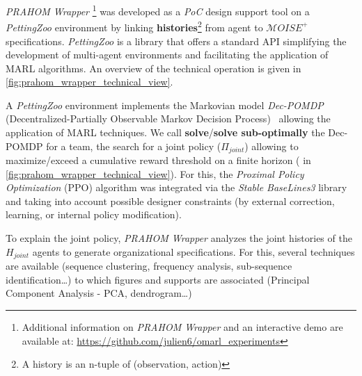 \documentclass[doubleblind]{ecai}
\begin{document}
\emph{PRAHOM Wrapper}\label{PettingZoo-wrapper}
\footnote{Additional information on \emph{PRAHOM Wrapper} and an interactive demo are available at: \url{https://github.com/julien6/omarl_experiments}}
was developed as a \emph{PoC} design support tool on a \emph{PettingZoo} environment by linking \textbf{histories}\footnote{A history is an n-tuple of (observation, action)} from agent to $\mathcal{M}OISE^+$ specifications. \emph{PettingZoo} is a library that offers a standard API simplifying the development of multi-agent environments and facilitating the application of MARL algorithms. An overview of the technical operation is given in \autoref{fig:prahom_wrapper_technical_view}.

A \emph{PettingZoo} environment implements the Markovian model \emph{Dec-POMDP} (Decentralized-Partially Observable Markov Decision Process)~\cite{Oliehoek2016} allowing the application of MARL techniques.
We call \textbf{solve}/\textbf{solve sub-optimally} the Dec-POMDP for a team, the search for a joint policy ($\Pi_{joint}$) allowing to maximize/exceed a cumulative reward threshold on a finite horizon ( in \autoref{fig:prahom_wrapper_technical_view}). For this, the \emph{Proximal Policy Optimization} (PPO) algorithm was integrated via the \emph{Stable BaseLines3} library and taking into account possible designer constraints (by external correction, learning, or internal policy modification).


To explain the joint policy, \emph{PRAHOM Wrapper} analyzes the joint histories of the $H_{joint}$ agents to generate organizational specifications. For this, several techniques are available (sequence clustering, frequency analysis, sub-sequence identification\dots) to which figures and supports are associated (Principal Component Analysis - PCA, dendrogram\dots)

\end{document}
